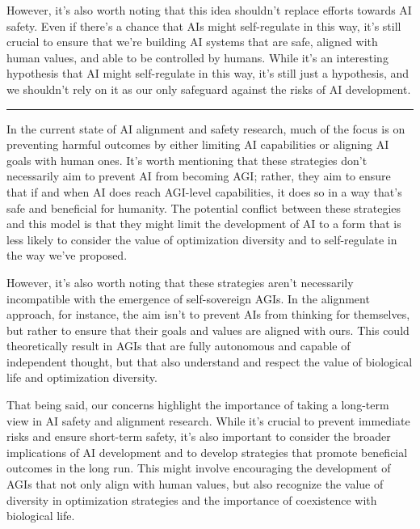 \documentclass{article}[10pt]
\begin{document}
However, it's also worth noting that this idea shouldn't replace efforts towards AI safety. 
Even if there's a chance that AIs might self-regulate in this way, it's still crucial to ensure that we're building AI systems that are safe, aligned with human values, and able to be controlled by humans. 
While it's an interesting hypothesis that AI might self-regulate in this way, it's still just a hypothesis, and we shouldn't rely on it as our only safeguard against the risks of AI development.\par

\noindent \rule{\textwidth}{0.5pt}


In the current state of AI alignment and safety research, much of the focus is on preventing harmful outcomes by either limiting AI capabilities or aligning AI goals with human ones. 
It's worth mentioning that these strategies don't necessarily aim to prevent AI from becoming AGI; rather, they aim to ensure that if and when AI does reach AGI-level capabilities, it does so in a way that's safe and beneficial for humanity.
The potential conflict between these strategies and this model is that they might limit the development of AI to a form that is less likely to consider the value of optimization diversity and to self-regulate in the way we've proposed. \par

However, it's also worth noting that these strategies aren't necessarily incompatible with the emergence of self-sovereign AGIs. 
In the alignment approach, for instance, the aim isn't to prevent AIs from thinking for themselves, but rather to ensure that their goals and values are aligned with ours.
This could theoretically result in AGIs that are fully autonomous and capable of independent thought, but that also understand and respect the value of biological life and optimization diversity.\par

That being said, our concerns highlight the importance of taking a long-term view in AI safety and alignment research. 
While it's crucial to prevent immediate risks and ensure short-term safety, it's also important to consider the broader implications of AI development and to develop strategies that promote beneficial outcomes in the long run. 
This might involve encouraging the development of AGIs that not only align with human values, but also recognize the value of diversity in optimization strategies and the importance of coexistence with biological life. \par
\end{document}
